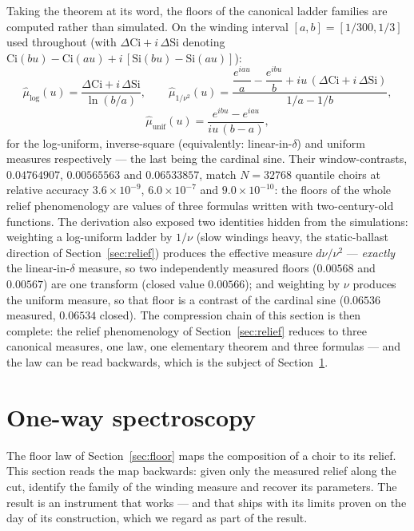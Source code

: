 \documentclass[11pt,a4paper]{article}
\begin{document}
Taking the theorem at its word, the floors of the canonical ladder
families are computed rather than simulated. On the winding interval
$[a,b] = [1/300, 1/3]$ used throughout (with
$\Delta\mathrm{Ci} + i\,\Delta\mathrm{Si}$ denoting
$\mathrm{Ci}(bu)-\mathrm{Ci}(au) + i\,[\mathrm{Si}(bu)-\mathrm{Si}(au)]$):
\begin{equation}
\hat{\mu}_{\log}(u) = \frac{\Delta\mathrm{Ci} + i\,\Delta\mathrm{Si}}
{\ln(b/a)},
\qquad
\hat{\mu}_{1/\nu^2}(u) = \frac{\dfrac{e^{iau}}{a} - \dfrac{e^{ibu}}{b}
+ iu\,(\Delta\mathrm{Ci} + i\,\Delta\mathrm{Si})}{1/a - 1/b},
\label{eq:closedfloors}
\end{equation}
\begin{equation}
\hat{\mu}_{\mathrm{unif}}(u) = \frac{e^{ibu} - e^{iau}}{iu\,(b-a)},
\label{eq:sincfloor}
\end{equation}
for the log-uniform, inverse-square (equivalently: linear-in-$\delta$)
and uniform measures respectively --- the last being the cardinal sine.
Their window-contrasts, $0.04764907$, $0.00565563$ and $0.06533857$,
match $N = 32768$ quantile choirs at relative accuracy
$3.6\times10^{-9}$, $6.0\times10^{-7}$ and $9.0\times10^{-10}$: the
floors of the whole relief phenomenology are values of three formulas
written with two-century-old functions. The derivation also exposed two
identities hidden from the simulations: weighting a log-uniform ladder
by $1/\nu$ (slow windings heavy, the static-ballast direction of
Section~\ref{sec:relief}) produces the effective measure
$d\nu/\nu^2$ --- \emph{exactly} the linear-in-$\delta$ measure, so two
independently measured floors ($0.00568$ and $0.00567$) are one
transform (closed value $0.00566$); and weighting by $\nu$ produces the
uniform measure, so that floor is a contrast of the cardinal sine
($0.06536$ measured, $0.06534$ closed). The compression chain of this
section is then complete: the relief phenomenology of
Section~\ref{sec:relief} reduces to three canonical measures, one law,
one elementary theorem and three formulas --- and the law can be read
backwards, which is the subject of Section~\ref{sec:spectroscopy}.

\section{One-way spectroscopy}
\label{sec:spectroscopy}

The floor law of Section~\ref{sec:floor} maps the composition of a choir
to its relief. This section reads the map backwards: given only the
measured relief along the cut, identify the family of the winding
measure and recover its parameters. The result is an instrument that
works --- and that ships with its limits proven on the day of its
construction, which we regard as part of the result.
\end{document}
